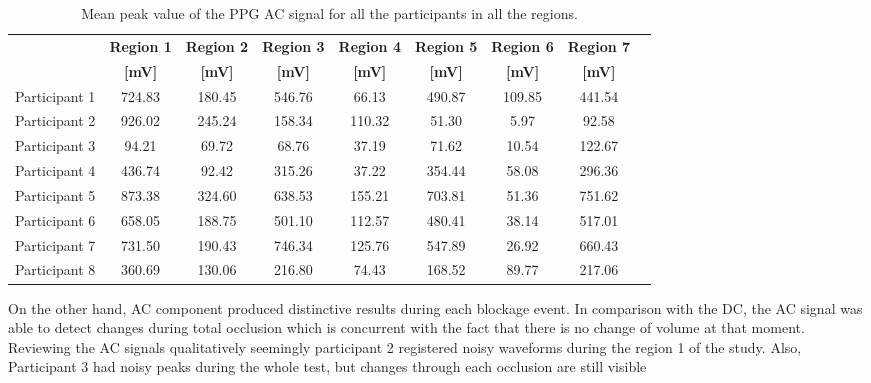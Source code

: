 \begin{table}[!htbp]
	\caption[Mean peak value of the PPG AC signal for all participants in all regions]{Mean peak value of the PPG AC signal for all the participants in all the regions.}
	\label{tbl:PPG RED AC}
	\centering \small
	\begin{tabular}{lcccccccc}
		\toprule
		& \textbf{Region 1}
		& \textbf{Region 2}
		& \textbf{Region 3}
		& \textbf{Region 4}
		& \textbf{Region 5}
		& \textbf{Region 6}
		& \textbf{Region 7} \\
		& \textbf{[\si{\milli\volt}]}
		& \textbf{[\si{\milli\volt}]}
		& \textbf{[\si{\milli\volt}]}		
		& \textbf{[\si{\milli\volt}]}		
		& \textbf{[\si{\milli\volt}]}
		& \textbf{[\si{\milli\volt}]}
		& \textbf{[\si{\milli\volt}]}\\\midrule
		Participant 1    &     724.83    &     180.45    &     546.76    &      66.13    &     490.87    &     109.85    &     441.54    \\  
		Participant 2    &     926.02    &     245.24    &     158.34    &     110.32    &      51.30    &       5.97    &      92.58    \\  
		Participant 3    &      94.21    &      69.72    &      68.76    &      37.19    &      71.62    &      10.54    &     122.67    \\  
		Participant 4    &     436.74    &      92.42    &     315.26    &      37.22    &     354.44    &      58.08    &     296.36    \\  
		Participant 5    &     873.38    &     324.60    &     638.53    &     155.21    &     703.81    &      51.36    &     751.62    \\  
		Participant 6    &     658.05    &     188.75    &     501.10    &     112.57    &     480.41    &      38.14    &     517.01    \\  
		Participant 7    &     731.50    &     190.43    &     746.34    &     125.76    &     547.89    &      26.92    &     660.43    \\  
		Participant 8    &     360.69    &     130.06    &     216.80    &      74.43    &     168.52    &      89.77    &     217.06    \\ 
		\bottomrule
	\end{tabular}
\end{table}

On the other hand, AC component produced distinctive results during each blockage event. In comparison with the DC, the AC signal was able to detect changes during total occlusion which is concurrent with the fact that there is no change of volume at that moment. Reviewing the AC signals qualitatively seemingly participant 2 registered noisy waveforms during the region 1 of the study. Also, Participant 3 had noisy peaks during the whole test, but changes through each occlusion are still visible

